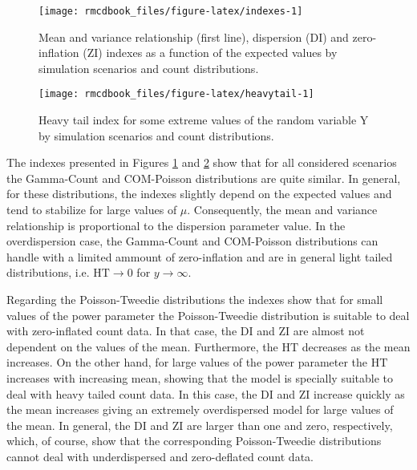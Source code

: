 \documentclass[9pt,a5paper,]{book}
\theoremstyle{definition}
\theoremstyle{definition}
\theoremstyle{remark}
\begin{document}
\begin{figure}[h]

{\centering \texttt{[image: rmcdbook\_files/figure-latex/indexes-1]} 

}

\caption{Mean and variance relationship (first line), dispersion (DI) and zero-inflation (ZI) indexes as a function of the expected values by simulation scenarios and count distributions.}\label{fig:indexes}
\end{figure}

\begin{figure}[h]

{\centering \texttt{[image: rmcdbook\_files/figure-latex/heavytail-1]} 

}

\caption{Heavy tail index for some extreme values of the random variable Y by simulation scenarios and count distributions.}\label{fig:heavytail}
\end{figure}

The indexes presented in Figures \ref{fig:indexes} and
\ref{fig:heavytail} show that for all considered scenarios the
Gamma-Count and COM-Poisson distributions are quite similar. In general,
for these distributions, the indexes slightly depend on the expected
values and tend to stabilize for large values of \(\mu\). Consequently,
the mean and variance relationship is proportional to the dispersion
parameter value. In the overdispersion case, the Gamma-Count and
COM-Poisson distributions can handle with a limited ammount of
zero-inflation and are in general light tailed distributions, i.e.
\(\mathrm{HT} \to 0\) for \(y \to \infty\).

Regarding the Poisson-Tweedie distributions the indexes show that for
small values of the power parameter the Poisson-Tweedie distribution is
suitable to deal with zero-inflated count data. In that case, the
\(\mathrm{DI}\) and \(\mathrm{ZI}\) are almost not dependent on the
values of the mean. Furthermore, the \(\mathrm{HT}\) decreases as the
mean increases. On the other hand, for large values of the power
parameter the \(\mathrm{HT}\) increases with increasing mean, showing
that the model is specially suitable to deal with heavy tailed count
data. In this case, the \(\mathrm{DI}\) and \(\mathrm{ZI}\) increase
quickly as the mean increases giving an extremely overdispersed model
for large values of the mean. In general, the \(\mathrm{DI}\) and
\(\mathrm{ZI}\) are larger than one and zero, respectively, which, of
course, show that the corresponding Poisson-Tweedie distributions cannot
deal with underdispersed and zero-deflated count data.
\end{document}

